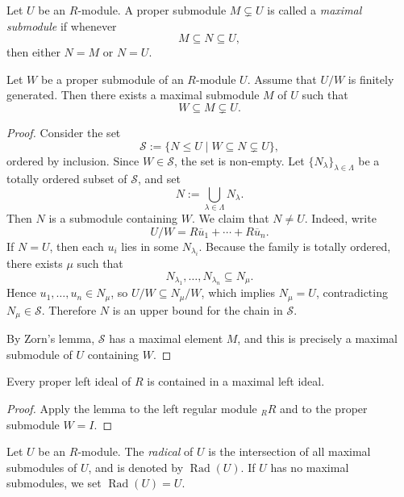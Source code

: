 \begin{definition}
    Let $U$ be an $R$-module. A proper submodule $M\subsetneq U$ is called a
    \emph{maximal submodule} if whenever
    \[
        M\subseteq N\subseteq U,
    \]
    then either $N=M$ or $N=U$.
\end{definition}

\begin{lemma}
    Let $W$ be a proper submodule of an $R$-module $U$. Assume that $U/W$ is finitely
    generated. Then there exists a maximal submodule $M$ of $U$ such that
    \[
        W\subseteq M\subsetneq U.
    \]
\end{lemma}

\begin{proof}
    Consider the set
    \[
        \mathcal{S}:=\{N\leq U\mid W\subseteq N\subsetneq U\},
    \]
    ordered by inclusion. Since $W\in \mathcal{S}$, the set is non-empty. Let $\{N_\lambda\}_{\lambda\in \Lambda}$ be a totally ordered subset of $\mathcal{S}$,
    and set
    \[
        N:=\bigcup_{\lambda\in\Lambda} N_\lambda.
    \]
    Then $N$ is a submodule containing $W$. We claim that $N\neq U$. Indeed, write
    \[
        U/W=R\overline{u}_1+\cdots+R\overline{u}_n.
    \]
    If $N=U$, then each $u_i$ lies in some $N_{\lambda_i}$. Because the family is totally
    ordered, there exists $\mu$ such that
    \[
        N_{\lambda_1},\dots,N_{\lambda_n}\subseteq N_\mu.
    \]
    Hence $u_1,\dots,u_n\in N_\mu$, so $U/W\subseteq N_\mu/W$, which implies $N_\mu=U$,
    contradicting $N_\mu\in\mathcal{S}$. Therefore $N$ is an upper bound for the chain
    in $\mathcal{S}$.

    By Zorn's lemma, $\mathcal{S}$ has a maximal element $M$, and this is precisely a
    maximal submodule of $U$ containing $W$.
\end{proof}

\begin{corollary}
    Every proper left ideal of $R$ is contained in a maximal left ideal.
\end{corollary}

\begin{proof}
    Apply the lemma to the left regular module ${}_R R$ and to the proper submodule $W=I$.
\end{proof}

\begin{definition}
    Let $U$ be an $R$-module. The \emph{radical} of $U$ is the intersection of all
    maximal submodules of $U$, and is denoted by $\operatorname{Rad}(U)$. If $U$ has no
    maximal submodules, we set $\operatorname{Rad}(U)=U$.
\end{definition}


